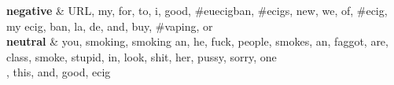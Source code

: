 {\bf negative} & URL, my, for, to, i, good, \#euecigban, \#ecigs, new, we, of, \#ecig, my ecig, ban, la, de, and, buy, \#vaping, or\\
\hline
{\bf neutral} & you, smoking, smoking an, he, fuck, people, smokes, an, faggot, are, class, smoke, stupid, in, look, shit, her, pussy, sorry, one\\
\hline
, this, and, good, ecig\\
\hline
